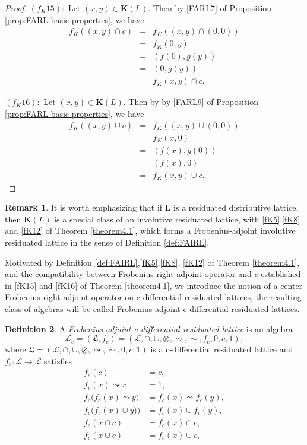 \documentclass[final,12pt,times]{elsarticle}
\theoremstyle{plain}
\theoremstyle{definition}
\newtheorem{definition}{Definition}[section]
\newtheorem{remark}[definition]{Remark}
\theoremstyle{break}
\begin{document}
\begin{proof}
$(f_K15)$:\ Let $(x,y)\in \mathbf{K}(L)$. Then by \ref{FARL7} of Proposition \ref{prop:FARL-basic-properties}, we have
\begin{eqnarray*}
f_K((x,y)\cap c)&=&f_K((x,y)\cap(0,0))\\&=& f_K(0,y)\\&=&(f(0), g(y))\\&=& (0,g(y))\\&=&f_K(x,y)\cap c.
\end{eqnarray*}

$(f_K16)$:\ Let $(x,y)\in \mathbf{K}(L)$. Then by by \ref{FARL9} of Proposition \ref{prop:FARL-basic-properties}, we have
\begin{eqnarray*}
f_K((x,y)\cup c)&=&f_K((x,y)\cup(0,0))\\&=&f_K(x,0)\\&=&(f (x), g(0))\\&=&(f(x),0)\\&=&f_K(x,y)\cup c.
\end{eqnarray*}
\end{proof}

\begin{remark}\label{remark4.2} It is worth emphasizing that if $\mathbf{L}$ is a residuated distributive lattice, then $\mathbf{K}(L)$ is a special class of an involutive residuated lattice, with \ref{fK5},\ref{fK8} and \ref{fK12} of Theorem \ref{theorem4.1}, which forms a Frobenius-adjoint involutive residuated lattice in the sense of Definition \ref{def:FAIRL}.
\end{remark}

Motivated by Definition \ref{def:FAIRL},\ref{fK5},\ref{fK8}, \ref{fK12} of Theorem \ref{theorem4.1}, and the compatibility between Frobenius right adjoint operator and $c$ established in \ref{fK15} and \ref{fK16} of Theorem \ref{theorem4.1}, we introduce the notion of a center Frobenius right adjoint operator on c-differential residuated lattices, the resulting class of algebras will be called Frobenius adjoint c-differential residuated lattices.

\begin{definition}\label{def:centered-FA}
A \emph{Frobenius-adjoint c-differential residuated lattice} is an algebra
\[
 \mathcal{\mathscr{L}}_c=(\boldsymbol{\mathfrak{L}}, f_c)
 =(\mathcal{L},\cap,\cup,\otimes,\leadsto,\sim,f_c,0,c,1),
\]
where $\boldsymbol{\mathfrak{L}}=(\mathcal{L},\cap,\cup,\otimes,\leadsto,\sim,0,c,1)$ is a c-differential
residuated lattice and $f_c:\mathcal{L}\to \mathcal{L}$ satisfies
\begin{align*}
 f_c(c)&=c,\tag{$f_c1$}\label{fc1}\\
 f_c(x)\leadsto x&=1,\tag{$f_c2$}\label{fc2}\\
 f_c\bigl(f_c(x)\leadsto y\bigr)
   &=f_c(x)\leadsto f_c(y),\tag{$f_c3$}\label{fc3}\\
 f_c\bigl(f_c(x)\cup y)\bigr)
   &=f_c(x)\cup f_c(y),\tag{$f_c4$}\label{fc4}\\
 f_c(x\cap c)&=f_c(x)\cap c,\tag{$f_c5$}\label{fc5}\\
 f_c(x\cup c)&=f_c(x)\cup c,\tag{$f_c6$}\label{fc6}
\end{align*}
\end{definition}
\end{document}
